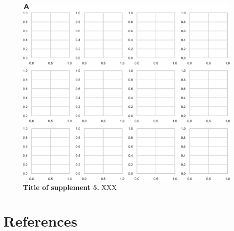 \documentclass[11pt]{article}
\begin{document}
\begin{figure}
\hypertarget{fig:supp5}{%
\centering
\includegraphics{./figures/figureS5.pdf}
\caption{\textbf{Title of supplement 5.} XXX}\label{fig:supp5}
}
\end{figure}

\cleardoublepage

\hypertarget{references}{%
\section{References}\label{references}}

\printbibliography
\end{document}

